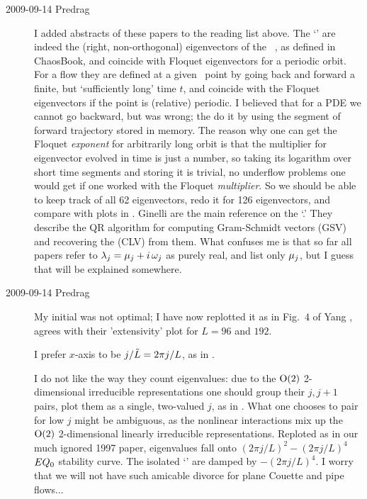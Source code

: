 \begin{description}
\item[2009-09-14 Predrag]
  I added abstracts of these papers to the reading list above.
  The `{\cLvs}' are indeed the (right,
  non-orthogonal) eigenvectors of the \jacobianM\ \jMps, as
  defined in ChaosBook, and coincide with Floquet eigenvectors
  for a periodic orbit. For a flow they are defined at a given
  \statesp\ point by going back and forward a finite, but
  `sufficiently long' time $t$, and coincide with the Floquet
  eigenvectors if the point is (relative) periodic. I believed
  that for a PDE we cannot go backward, but was wrong; the do
  it by using the segment of forward trajectory stored in
  memory. The reason why one can get the Floquet {\em exponent}
  for arbitrarily long orbit is that the multiplier for eigenvector
  evolved in time is just a number, so taking its logarithm over
  short time segments and
  storing it is trivial, no underflow problems one would get if
  one worked with the Floquet {\em multiplier}. So we should be able
  to keep track of all 62 eigenvectors, redo it for 126 eigenvectors,
  and compare with plots in .
  Ginelli \etal{} are the main
  reference on the `{\cLvs}.' They describe
  the QR algorithm for computing Gram-Schmidt vectors (GSV) and
  recovering the {\cLvs} (CLV) from them.
  What confuses me is that so far all papers refer to $\Lyap_j
  = \eigRe_j + i \, \eigIm_j$ as purely real, and list only
  $\eigRe_j$, but I guess that will be explained somewhere.

\item[2009-09-14 Predrag]
  My initial  was not optimal; I have now
  replotted it as in Fig.~4 of
  Yang \etal{},
  agrees with their 'extensivity' plot for $L=96$ and $192$.

  I prefer $x$-axis to be $j/\tilde{L} = 2 \pi j/L$, as in
  .

  I do not like the way they count eigenvalues:  due to the $\textrm{O}(2)$
  2-dimensional irreducible representations
  one should group their $j,j+1$ pairs,
  plot them as a single, two-valued $j$, as in
  . What one chooses to pair for low
  $j$ might be ambiguous, as the nonlinear interactions mix up
  the $\textrm{O}(2)$ 2-dimensional linearly irreducible representations.
  Reploted as in our much ignored 1997 paper,
  eigenvalues fall onto $ (2 \pi j/L)^2 - (2 \pi j/L)^4 $
  \eqv\ $EQ_{0}$  stability curve.
  The isolated `{\cLvs}'
  are damped by $-(2 \pi j/L)^4$. I worry that we will not have such
  amicable divorce for plane Couette and pipe flows...


\end{description}
